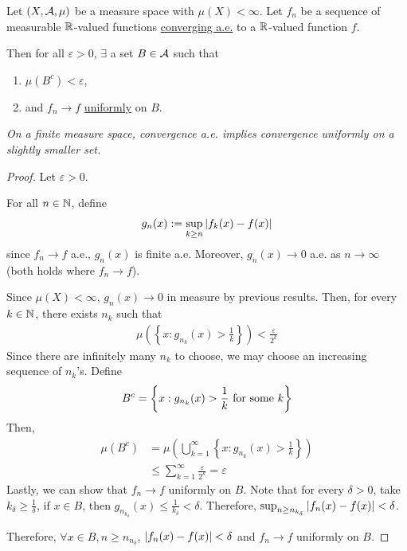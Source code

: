 \documentclass[11pt]{article}
\begin{document}
	\begin{theorem}
		Let $(X, \mathcal{{A}}, \mu)$ be a measure space with \ul{$\mu(X) < \infty$}. Let $f_n$ be a sequence of measurable $\mathbb{R}$-valued functions \ul{converging a.e.} to a $\mathbb{R}$-valued function $f$.
		
		Then for all $\varepsilon > 0$, $\exists$ a set $B \in \mathcal{{A}}$ such that
		\begin{enumerate}
			\item $\mu(B^c) < \varepsilon$,
			\item and $f_n \to f$ \ul{uniformly} on $B$.
		\end{enumerate}
		\emph{On a finite measure space, convergence a.e. implies convergence uniformly on a slightly smaller set.}
		\begin{proof}
			Let $\varepsilon > 0$.
			
			For all $n \in \mathbb{N}$, define
			\begin{align}
				g_n(x) := \sup_{k \geq n} \left \vert {f_k(x) - f(x)} \right \vert
			\end{align}
			since $f_n \to f$ a.e., $g_n(x)$ is finite a.e. Moreover, $g_n(x) \to 0$ a.e. as $n \to \infty$ (both holds where $f_n \to f$).
			
			Since $\mu(X) < \infty$, $g_n(x) \to 0$ in measure by previous results. Then, for every $k \in \mathbb{N}$, there exists $n_k$ such that
			\begin{align}
				\mu\left(\left\{x : g_{n_k}(x) > \frac{1}{k} \right\}\right) < \frac{\varepsilon}{2^k}
			\end{align}
			Since there are infinitely many $n_k$ to choose, we may choose an increasing sequence of $n_k$'s. Define
			\begin{align}
				B^c = \left\{ x: g_{n_k}(x) > \frac{1}{k} \text{{ for some }} k\right\}
			\end{align}
			Then,
			\begin{align}
				\mu(B^c) &= \mu\left(\bigcup_{k=1}^\infty \left\{ x: g_{n_k}(x) > \frac{1}{k} \right\}\right) \\
				&\leq \sum_{k=1}^\infty \frac{\varepsilon}{2^k} = \varepsilon
			\end{align}
			Lastly, we can show that $f_n \to f$ uniformly on $B$. Note that for every $\delta > 0$, take $k_\delta \geq \frac{1}{\delta}$, if $x \in B$, then $g_{n_{k_\delta}}(x) \leq \frac{1}{k_\delta} < \delta$. Therefore, $\sup_{n \geq n_{k_\delta}} \left \vert {f_n(x) - f(x)} \right \vert < \delta$.
			
			Therefore, $\forall x\in B, n \geq n_{n_\delta}$, $\left \vert {f_n(x) - f(x)} \right \vert < \delta$ and $f_n \to f$ uniformly on $B$.
		\end{proof}
	\end{theorem}
	
\end{document}
